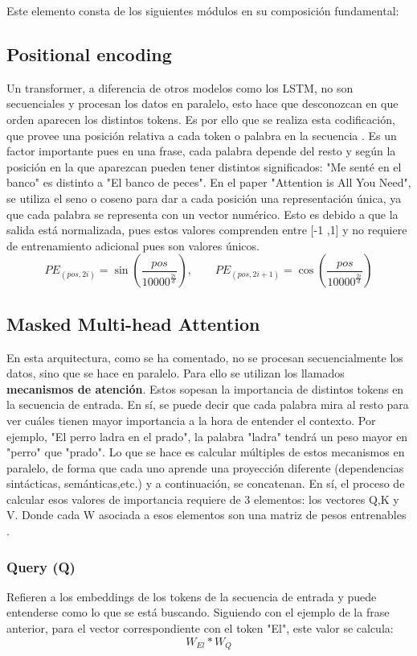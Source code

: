 \documentclass[11pt]{book}
\begin{document}
Este elemento consta de los siguientes módulos en su composición fundamental:
\subsection{Positional encoding}
Un transformer, a diferencia de otros modelos como los LSTM, no son secuenciales y procesan los datos en paralelo, esto hace que desconozcan en que orden aparecen los distintos tokens. Es por ello que se realiza esta codificación, que provee una posición relativa a cada token o palabra en la secuencia \parencite{phillips2019positional}. Es un factor importante pues en una frase, cada palabra depende del resto y según la posición en la que aparezcan pueden tener distintos significados: "Me senté en el banco" es distinto a "El banco de peces". En el paper "Attention is All You Need", se utiliza el seno o coseno para dar a cada posición una representación única, ya que cada palabra se representa con un vector numérico. Esto es debido a que la salida está normalizada, pues estos valores comprenden entre [-1 ,1] y no requiere de entrenamiento adicional pues son valores únicos. 
    \[
    PE_{(pos, 2i)} = \sin\!\left(\frac{pos}{10000^{\tfrac{2i}{d}}}\right), 
    \qquad
    PE_{(pos, 2i+1)} = \cos\!\left(\frac{pos}{10000^{\tfrac{2i}{d}}}\right)
    \]
\subsection{Masked Multi-head Attention}\label{subsec:multihead}
En esta arquitectura, como se ha comentado, no se procesan secuencialmente los datos, sino que se hace en paralelo. Para ello se utilizan los llamados \textbf{mecanismos de atención}. Estos sopesan la importancia de distintos tokens en la secuencia de entrada. En sí, se puede decir que cada palabra mira al resto para ver cuáles tienen mayor importancia a la hora de entender el contexto. Por ejemplo, "El perro ladra en el prado", la palabra "ladra" tendrá un peso mayor en "perro" que "prado". Lo que se hace es calcular múltiples de estos mecanismos en paralelo, de forma que cada uno aprende una proyección diferente (dependencias sintácticas, semánticas,etc.) y a continuación, se concatenan. 
En sí, el proceso de calcular esos valores de importancia requiere de 3 elementos: los vectores Q,K y V. Donde cada W asociada a esos elementos son una matriz de pesos entrenables \parencite{analytics2020qkv}.

\subsubsection{Query (Q)}
Refieren a los embeddings de los tokens de la secuencia de entrada y puede entenderse como lo que se está buscando. Siguiendo con el ejemplo de la frase anterior, para el vector correspondiente con el token "El", este valor se calcula: \[W_{El} * W_{Q}\]
\end{document}
